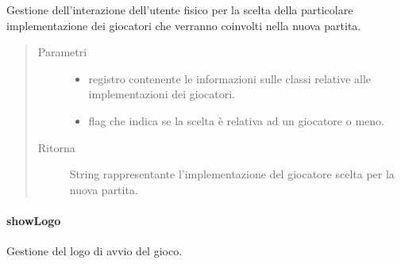 \documentclass[letterpaper,10pt,italian,openany,oneside]{sphinxmanual}
\begin{document}
\begin{fulllineitems}
\label{\detokenize{source/it/unicam/cs/pa/mastermind/ui/StartView:it.unicam.cs.pa.mastermind.ui.StartView.getPlayerName(PlayerFactoryRegistry, boolean)}}
Gestione dell’interazione dell’utente fisico per la scelta della particolare implementazione dei giocatori che verranno coinvolti nella nuova partita.
\begin{quote}\begin{description}
\item[{Parametri}] \leavevmode\begin{itemize}
\item {} 
 \textendash{} registro contenente le informazioni sulle classi  relative alle implementazioni dei giocatori.

\item {} 
 \textendash{} flag che indica se la scelta è relativa ad un giocatore  o meno.

\end{itemize}

\item[{Ritorna}] \leavevmode
String rappresentante l’implementazione del giocatore scelta per la nuova partita.

\end{description}\end{quote}

\end{fulllineitems}



\paragraph{showLogo}
\label{\detokenize{source/it/unicam/cs/pa/mastermind/ui/StartView:showlogo}}

\begin{fulllineitems}
\label{\detokenize{source/it/unicam/cs/pa/mastermind/ui/StartView:it.unicam.cs.pa.mastermind.ui.StartView.showLogo()}}
Gestione del logo di avvio del gioco.

\end{fulllineitems}
\end{document}
